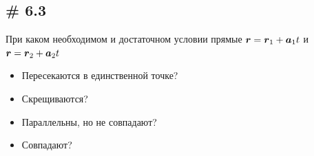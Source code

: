 \documentclass[a4paper,12pt]{article}
\begin{document}
  
  \subsection{\# 6.3}
  
  \begin{problem}
    При каком необходимом и достаточном условии прямые $\bds r \hm= \bds r_1 + \bds a_1 t$ и $\bds r \hm= \bds r_2 \hm+ \bds a_2 t$
    \begin{itemize}
      \item Пересекаются в единственной точке?
      \item Скрещиваются?
      \item Параллельны, но не совпадают?
      \item Совпадают?
    \end{itemize}
  \end{problem}
  
\end{document}
